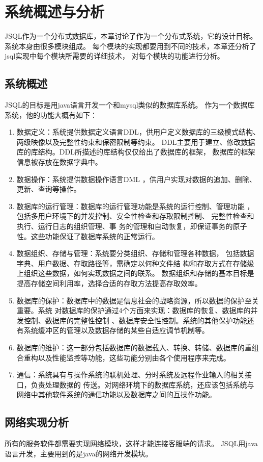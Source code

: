 
\chapter{系统概述与分析}
JSQL作为一个分布式数据库，本章讨论了作为一个分布式系统，它的设计目标。
系统本身由很多模块组成。 
每个模块的实现都要用到不同的技术，本章还分析了jsql实现中每个模块所需要的详细技术，
对每个模块的功能进行分析。
\section{系统概述}
JSQL的目标是用java语言开发一个和mysql类似的数据库系统。
作为一个数据库系统，他的功能大概有如下：
\begin{enumerate}
	\item 数据定义：系统提供数据定义语言DDL，供用户定义数据库的三级模式结构、两级映像以及完整性约束和保密限制等约束。
	DDL主要用于建立、修改数据库的库结构。DDL所描述的库结构仅仅给出了数据库的框架，
	数据库的框架信息被存放在数据字典中。
	\item 数据操作：系统提供数据操作语言DML
	，供用户实现对数据的追加、删除、更新、查询等操作。
	\item 数据库的运行管理：数据库的运行管理功能是系统的运行控制、管理功能
	，包括多用户环境下的并发控制、安全性检查和存取限制控制、
	完整性检查和执行、运行日志的组织管理、事
	务的管理和自动恢复，即保证事务的原子性。这些功能保证了数据库系统的正常运行。
	\item 数据组织、存储与管理：系统要分类组织、存储和管理各种数据，
	包括数据字典、用户数据、存取路径等，需确定以何种文件结
	构和存取方式在存储级上组织这些数据，如何实现数据之间的联系。
	数据组织和存储的基本目标是提高存储空间利用率，选择合适的存取方法提高存取效率。
	\item   数据库的保护：数据库中的数据是信息社会的战略资源，所以数据的保护至关重要。系统
	对数据库的保护通过4个方面来实现：数据库的恢复、数据库的并发控制、数据库的完整性控制
	、数据库安全性控制。系统的其他保护功能还有系统缓冲区的管理以及数据存储的某些自适应调节机制等。
	\item  数据库的维护：这一部分包括数据库的数据载入、转换、转储、数据库的重组合重构以及性能监控等功能，这些功能分别由各个使用程序来完成。
	\item 通信：系统具有与操作系统的联机处理、分时系统及远程作业输入的相关接口，负责处理数据的
	传送。对网络环境下的数据库系统，还应该包括系统与网络中其他软件系统的通信功能以及数据库之间的互操作功能。
\end{enumerate}
\section{网络实现分析}
所有的服务软件都需要实现网络模块，这样才能连接客服端的请求。
JSQL用java语言开发，主要用到的是java的网络开发模块。
